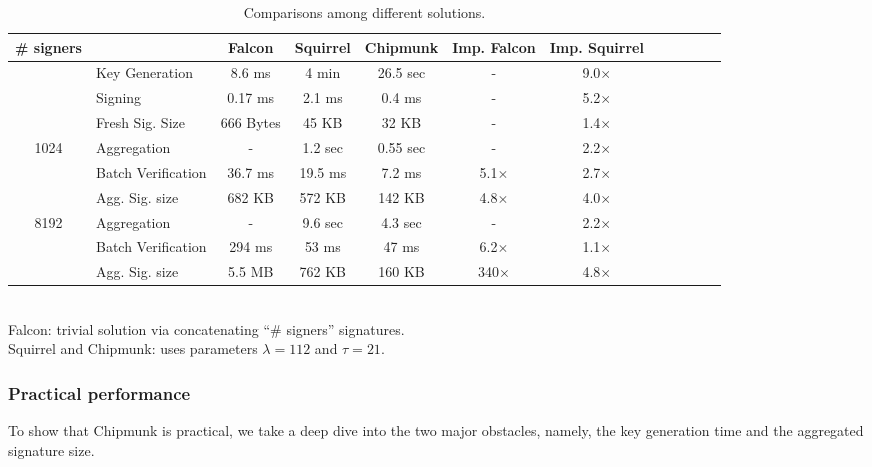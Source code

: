 \begin{table}\centering
  \begin{tabular}{|c||l|c|c|c||c|c|c|c||c|c|c|}\hline
    \# signers      &                 & Falcon      & Squirrel  & Chipmunk  & Imp. Falcon & Imp. Squirrel \\\hline\hline
    \multirow{2}{*}{} 
                    & Key Generation  & 8.6 ms      & 4 min     & 26.5 sec  &     -       & 9.0$\times$ \\\cline{2-7}
                    & Signing         & 0.17 ms     & 2.1 ms    & 0.4 ms    &     -       & 5.2$\times$ \\\cline{2-7}
                    &Fresh Sig. Size  & 666 Bytes   & 45 KB     & 32 KB     &     -       & 1.4$\times$ \\\hline\hline
    \multirow{3}{*}{1024}                
                    &Aggregation      & -           & 1.2 sec   & 0.55 sec  &     -       & 2.2$\times$ \\\cline{2-7}
                    &Batch Verification    
                                      & 36.7 ms     & 19.5 ms   & 7.2 ms    & 5.1$\times$ & 2.7$\times$ \\\cline{2-7}
                    
                    &Agg. Sig. size   & 682 KB      & 572 KB    & 142 KB    & 4.8$\times$ & 4.0$\times$ \\\hline\hline
    \multirow{3}{*}{8192}                
                    &Aggregation      & -           & 9.6 sec   & 4.3 sec   &     -       & 2.2$\times$ \\\cline{2-7}
                    &Batch Verification    
                                      & 294 ms      & 53  ms    &  47 ms    & 6.2$\times$ & 1.1$\times$ \\\cline{2-7}
                    &Agg. Sig. size   & 5.5 MB      & 762 KB    & 160 KB    & 340$\times$ & 4.8$\times$ \\\hline
  \end{tabular}\\
  Falcon: trivial solution via concatenating ``\# signers''  signatures.\\
  Squirrel and Chipmunk: uses parameters $\lambda = 112$ and $\tau=21$. \\
  \caption{Comparisons among different solutions.}

\end{table}

\subsubsection{Practical performance}
To show that Chipmunk is practical, 
we take a deep dive into the two major obstacles, namely, the key generation time and the aggregated signature size.

